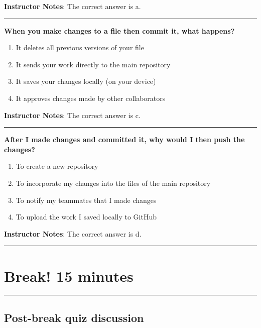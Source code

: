 \documentclass[
  letterpaper,
  DIV=11,
  numbers=noendperiod]{scrartcl}
\begin{document}
\textbf{Instructor Notes}: The correct answer is a.

\begin{center}\rule{0.5\linewidth}{0.5pt}\end{center}

\textbf{When you make changes to a file then commit it, what happens?}

\begin{enumerate}
\def\labelenumi{\alph{enumi}.}
\item
  It deletes all previous versions of your file
\item
  It sends your work directly to the main repository
\item
  It saves your changes locally (on your device)
\item
  It approves changes made by other collaborators
\end{enumerate}

\textbf{Instructor Notes}: The correct answer is c.

\begin{center}\rule{0.5\linewidth}{0.5pt}\end{center}

\textbf{After I made changes and committed it, why would I then push the
changes?}

\begin{enumerate}
\def\labelenumi{\alph{enumi}.}
\item
  To create a new repository
\item
  To incorporate my changes into the files of the main repository
\item
  To notify my teammates that I made changes
\item
  To upload the work I saved locally to GitHub
\end{enumerate}

\textbf{Instructor Notes}: The correct answer is d.

\begin{center}\rule{0.5\linewidth}{0.5pt}\end{center}

\section{Break! 15 minutes}\label{break-15-minutes}

\begin{center}\rule{0.5\linewidth}{0.5pt}\end{center}

\subsection{Post-break quiz
discussion}\label{post-break-quiz-discussion}
\end{document}
